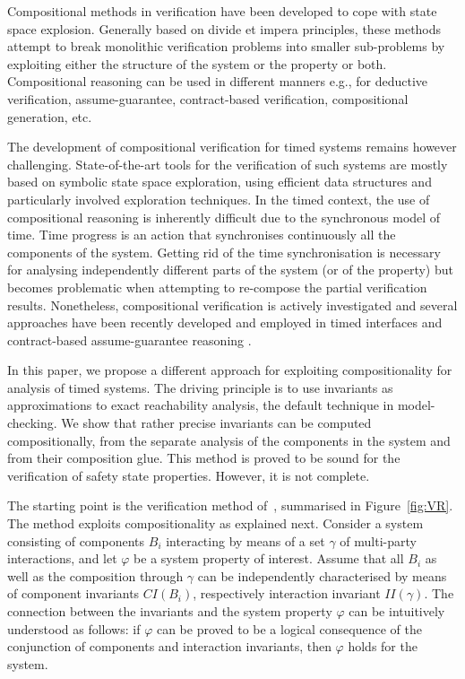 \documentclass{LMCS}
\newcommand{\cn}{\mathit{B}\xspace}
\newcommand{\ic}{\mathit{CI}}
\newcommand{\iim}{\mathit{II}}
\theoremstyle{plain}\newtheorem{remark}[thm]{Remark}
\theoremstyle{plain}\newtheorem{example}[thm]{Example}
\begin{document}
Compositional methods in verification have been developed to cope with
state space explosion. Generally based on divide et impera principles,
these methods attempt to break monolithic verification problems into
smaller sub-problems by exploiting either the structure of the system
or the property or both. Compositional reasoning can be used in
different manners e.g., for deductive verification, assume-guarantee,
contract-based verification, compositional generation, etc.

The development of compositional verification for timed systems
remains however challenging. State-of-the-art tools
\cite{uppaal,kronos,red06,Romeo2005} for the verification of such
systems are mostly based on symbolic state space exploration, using
efficient data structures and particularly involved exploration
techniques.  In the timed context, the use of compositional reasoning
is inherently difficult due to the synchronous model of time. Time
progress is an action that synchronises continuously all the
components of the system. Getting rid of the time synchronisation is
necessary for analysing independently different parts of the system
(or of the property) but becomes problematic when attempting to
re-compose the partial verification results.  Nonetheless,
compositional verification is actively investigated and several
approaches have been recently developed and employed in timed
interfaces \cite{Alfaro02} and contract-based assume-guarantee
reasoning \cite{Ecdar,AutomaticCompERAs}.

In this paper, we propose a different approach for exploiting
compositionality for analysis of timed systems. The driving principle
is to use invariants as approximations to exact reachability analysis,
the default technique in model-checking.  We show that rather
precise invariants can be computed compositionally, from the separate
analysis of the components in the system and from their composition
glue. This method is proved to be sound for the verification of safety
state properties. However, it is not complete.

The starting point is the verification method of~\cite{dfinder},
summarised in Figure~\ref{fig:VR}. The method exploits
compositionality as explained next. Consider a system consisting of
components $\cn_i$ interacting by means of a set $\gamma$ of
multi-party interactions, and let $\varphi$ be a system property of
interest. Assume that all $\cn_i$ as well as the composition through
$\gamma$ can be independently characterised by means of component
invariants $\ic(B_i)$, respectively interaction invariant
$\iim(\gamma)$. The connection between the invariants and the system
property $\varphi$ can be intuitively understood as follows: if $\varphi$
can be proved to be a logical consequence of the conjunction of
components and interaction invariants, then $\varphi$ holds for the
system.
\end{document}
